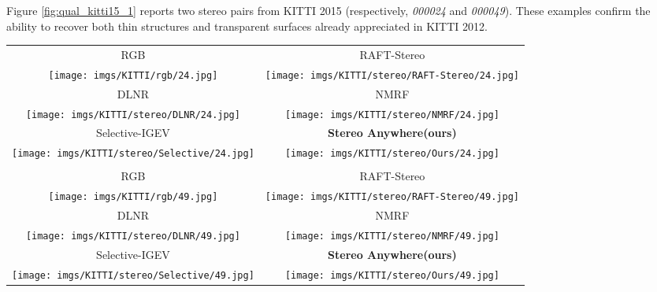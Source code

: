 \documentclass[10pt,twocolumn,letterpaper]{article}
\newcommand{\method}[0]{Stereo Anywhere\xspace}
\begin{document}
\clearpage

Figure \ref{fig:qual_kitti15_1} reports two stereo pairs from KITTI 2015 (respectively, \textit{000024} and \textit{000049}). These examples confirm the ability to recover both thin structures and transparent surfaces already appreciated in KITTI 2012.

\begin{figure*}[h]
    \centering
    \renewcommand{\tabcolsep}{1pt}
    \begin{tabular}{cc}
        \small RGB &
        \small RAFT-Stereo \cite{lipson2021raft} \\
        \texttt{[image: imgs/KITTI/rgb/24.jpg]} &
        \texttt{[image: imgs/KITTI/stereo/RAFT-Stereo/24.jpg]} \\
        \small DLNR \cite{zhao2023high} &
        \small NMRF \cite{guan2024neural} \\
        \texttt{[image: imgs/KITTI/stereo/DLNR/24.jpg]} &
        \texttt{[image: imgs/KITTI/stereo/NMRF/24.jpg]} \\
        \small Selective-IGEV \cite{wang2024selective} &
        \textbf{\method (ours)} \\
        \texttt{[image: imgs/KITTI/stereo/Selective/24.jpg]} &
        \texttt{[image: imgs/KITTI/stereo/Ours/24.jpg]} \\ \\
        \small RGB &
        \small RAFT-Stereo \cite{lipson2021raft} \\
        \texttt{[image: imgs/KITTI/rgb/49.jpg]} &
        \texttt{[image: imgs/KITTI/stereo/RAFT-Stereo/49.jpg]} \\
        \small DLNR \cite{zhao2023high} &
        \small NMRF \cite{guan2024neural} \\
        \texttt{[image: imgs/KITTI/stereo/DLNR/49.jpg]} &
        \texttt{[image: imgs/KITTI/stereo/NMRF/49.jpg]} \\
        \small Selective-IGEV \cite{wang2024selective} &
        \textbf{\method (ours)} \\
        \texttt{[image: imgs/KITTI/stereo/Selective/49.jpg]} &
        \texttt{[image: imgs/KITTI/stereo/Ours/49.jpg]} \\
    \end{tabular}

    \caption{\textbf{Qualitative Results -- KITTI 2015 (part 1).} Predictions by state-of-the-art models and \method.}
    \label{fig:qual_kitti15_1}\vspace{-0.3cm}

\end{figure*}
\end{document}
